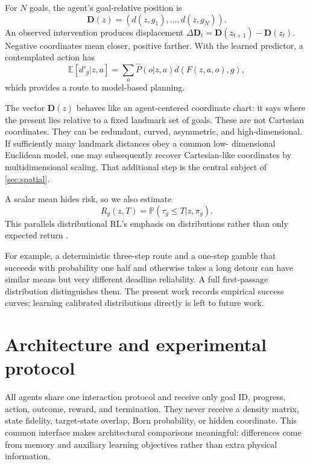 \documentclass[11pt]{article}
\newcommand{\E}{\mathbb E}
\newcommand{\Prob}{\mathbb P}
\begin{document}
For $N$ goals, the agent's goal-relative position is
\begin{equation}
 \bm D(z)=(d(z,g_1),\ldots,d(z,g_N)).
\end{equation}
An observed intervention produces displacement
$\Delta\bm D_t=\bm D(z_{t+1})-\bm D(z_t)$. Negative coordinates mean closer,
positive farther. With the learned predictor, a contemplated action has
\begin{equation}
 \E[d'_g|z,a]=\sum_o\widehat P(o|z,a)d(F(z,a,o),g), \label{eq:planning}
\end{equation}
which provides a route to model-based planning.

The vector $\bm D(z)$ behaves like an agent-centered coordinate chart: it says
where the present lies relative to a fixed landmark set of goals. These are
not Cartesian coordinates. They can be redundant, curved, asymmetric, and
high-dimensional. If sufficiently many landmark distances obey a common low-
dimensional Euclidean model, one may subsequently recover Cartesian-like
coordinates by multidimensional scaling. That additional step is the central
subject of \cref{sec:spatial}.

A scalar mean hides risk, so we also estimate
\begin{equation}
 R_g(z,T)=\Prob(\tau_g\le T|z,\pi_g). \label{eq:curve}
\end{equation}
This parallels distributional RL's emphasis on distributions rather than only
expected return \cite{bellemare2017}.

For example, a deterministic three-step route and a one-step gamble that
succeeds with probability one half and otherwise takes a long detour can have
similar means but very different deadline reliability. A full first-passage
distribution distinguishes them. The present work records empirical success
curves; learning calibrated distributions directly is left to future work.

\section{Architecture and experimental protocol}
\label{sec:methods}

All agents share one interaction protocol and receive only goal ID, progress,
action, outcome, reward, and termination. They never receive a density matrix,
state fidelity, target-state overlap, Born probability, or hidden coordinate.
This common interface makes architectural comparisons meaningful: differences
come from memory and auxiliary learning objectives rather than extra physical
information.
\end{document}
